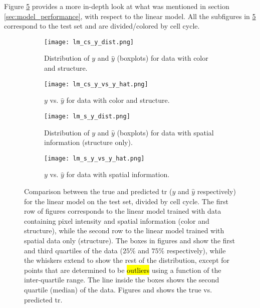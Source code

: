 
\glsresetall
\graphicspath{{./Sections/Results/Resources/}}


Figure \ref{fig:results:lm_performance} provides a more in-depth look at what was mentioned in section \ref{sec:model_performance}, with respect to the linear model. All the subfigures in \ref{fig:results:lm_performance} correspond to the test set and are divided/colored by cell cycle.

\begin{figure}[!ht]
  \centering
  \begin{subfigure}[b]{.5\linewidth}
    \texttt{[image: lm\_cs\_y\_dist.png]}
    \caption{Distribution of $y$ and $\hat{y}$ (boxplots) for data with color and structure.}
    \label{fig:results:lm_performance:cs_dist}
  \end{subfigure}
  \begin{subfigure}[b]{.27\linewidth}
    \texttt{[image: lm\_cs\_y\_vs\_y\_hat.png]}
    \caption{$y$ vs. $\hat{y}$ for data with color and structure.}
    \label{fig:results:lm_performance:cs_y_vs_y_hat}
  \end{subfigure}%
  \vspace{3mm}
  \begin{subfigure}[b]{.5\linewidth}
    \texttt{[image: lm\_s\_y\_dist.png]}
    \caption{Distribution of $y$ and $\hat{y}$ (boxplots) for data with spatial information (structure only).}
    \label{fig:results:lm_performance:s_dist}
  \end{subfigure}
  \begin{subfigure}[b]{.27\linewidth}
    \texttt{[image: lm\_s\_y\_vs\_y\_hat.png]}
    \caption{$y$ vs. $\hat{y}$ for data with spatial information.}
    \label{fig:results:lm_performance:s_y_vs_y_hat}
  \end{subfigure}
  \caption{Comparison between the true and predicted \gls{tr} ($y$ and $\hat{y}$ respectively) for the linear model on the test set, divided by cell cycle. The first row of figures corresponds to the linear model trained with data containing pixel intensity and spatial information (color and structure), while the second row to the linear model trained with spatial data only (structure). The boxes in figures  and  show the first and third quartiles of the data ($25\%$ and $75\%$ respectively), while the whiskers extend to show the rest of the distribution, except for points that are determined to be \hl{outliers} using a function of the inter-quartile range. The line inside the boxes shows the second quartile (median) of the data. Figures  and  shows the true vs. predicted \gls{tr}.}
  \label{fig:results:lm_performance}
\end{figure}

